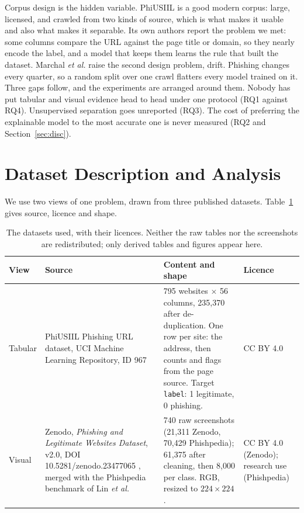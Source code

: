 \documentclass[11pt,journal,a4paper]{IEEEtran}
\newcommand{\tabfont}{\fontsize{11}{13}\selectfont}
\begin{document}
Corpus design is the hidden variable. PhiUSIIL \cite{prasad2024phiusiil} is a good modern corpus: large, licensed,
and crawled from two kinds of source, which is what makes it usable and also what makes it separable.
Its own authors report the problem we met: some columns compare the URL against the page title or domain, so they
nearly encode the label, and a model that keeps them learns the rule that built the dataset. Marchal \emph{et al.}
\cite{marchal2014phishstorm} raise the second design problem, drift. Phishing changes every quarter, so a random
split over one crawl flatters every model trained on it. Three gaps follow, and the experiments are arranged around them. Nobody has
put tabular and visual evidence head to head under one protocol (RQ1 against RQ4). Unsupervised separation goes
unreported (RQ3). The cost of preferring the explainable model to the most accurate one is never measured (RQ2
and Section~\ref{sec:disc}).

\section{Dataset Description and Analysis}

We use two views of one problem, drawn from three published datasets. Table~\ref{tab:data} gives source, licence
and shape.

\begin{table}[!t]
\centering
\caption{The datasets used, with their licences. Neither the raw tables nor the screenshots are
redistributed; only derived tables and figures appear here.}
\label{tab:data}
\tabfont
\setlength{\tabcolsep}{4pt}
\begin{tabular}{@{}>{\raggedright\arraybackslash}p{1.2cm}>{\raggedright\arraybackslash}p{4.4cm}>{\raggedright\arraybackslash}p{7.2cm}>{\raggedright\arraybackslash}p{2.7cm}@{}}
\toprule
\textbf{View} & \textbf{Source} & \textbf{Content and shape} & \textbf{Licence} \\
\midrule
Tabular &
PhiUSIIL Phishing URL dataset, UCI Machine Learning Repository, ID 967 \cite{prasad2024phiusiil} &
235{,}795 websites $\times$ 56 columns, 235{,}370 after de-duplication. One row per site: the address, then
counts and flags from the page source. Target \texttt{label}: 1 legitimate, 0 phishing. &
CC BY 4.0 \\
\addlinespace
Visual &
Zenodo, \emph{Phishing and Legitimate Websites Dataset}, v2.0, DOI 10.5281/zenodo.23477065
\cite{yadav2026zenodo}, merged with the Phishpedia benchmark of Lin \emph{et al.} \cite{lin2021phishpedia} &
91{,}740 raw screenshots (21{,}311 Zenodo, 70{,}429 Phishpedia); 61{,}375 after cleaning, then 8{,}000 per
class. RGB, resized to $224\times224$. &
CC BY 4.0 (Zenodo); research use (Phishpedia) \\
\bottomrule
\end{tabular}
\end{table}
\end{document}
